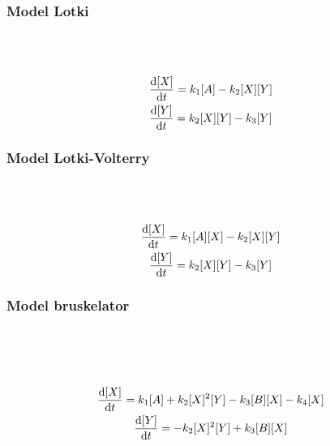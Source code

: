 \documentclass[10pt, a4paper, twoside, onecolumn]{article}
\numberwithin{equation}{section}
\begin{document}
	\subsubsection{Model Lotki}
	\begin{center}
		 \\
		 \\
	\end{center}
	\begin{gather}
		\dv{[X]}{t}=k_{1}[A]-k_{2}[X][Y] \\
		\dv{[Y]}{t}=k_{2}[X][Y]-k_{3}[Y]
	\end{gather}
	\subsubsection{Model Lotki-Volterry}
	\begin{center}
		 \\
		 \\
	\end{center}
	\begin{gather}
		\dv{[X]}{t}=k_{1}[A][X]-k_{2}[X][Y] \\
		\dv{[Y]}{t}=k_{2}[X][Y]-k_{3}[Y]
	\end{gather}
	\subsubsection{Model bruskelator}
	\begin{center}
		 \\
		 \\
		 \\
	\end{center}
	\begin{gather}
		\dv{[X]}{t}=k_{1}[A]+k_{2}[X]^{2}[Y]-k_{3}[B][X]-k_{4}[X] \\
		\dv{[Y]}{t}=-k_{2}[X]^{2}[Y]+k_{3}[B][X]
	\end{gather}
\end{document}
